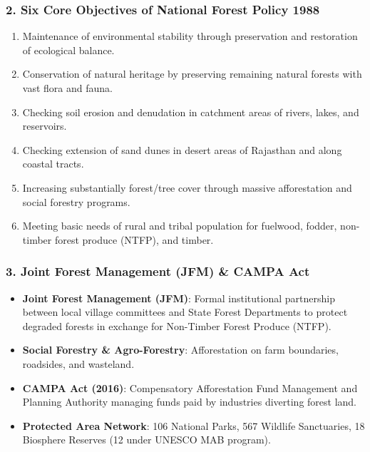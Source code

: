 \documentclass[11pt,a4paper]{article}
\begin{document}
\subsubsection{2. Six Core Objectives of National Forest Policy 1988}
\begin{enumerate}[leftmargin=*]
  \item Maintenance of environmental stability through preservation and restoration of ecological balance.
  \item Conservation of natural heritage by preserving remaining natural forests with vast flora and fauna.
  \item Checking soil erosion and denudation in catchment areas of rivers, lakes, and reservoirs.
  \item Checking extension of sand dunes in desert areas of Rajasthan and along coastal tracts.
  \item Increasing substantially forest/tree cover through massive afforestation and social forestry programs.
  \item Meeting basic needs of rural and tribal population for fuelwood, fodder, non-timber forest produce (NTFP), and timber.
\end{enumerate}

\subsubsection{3. Joint Forest Management (JFM) & CAMPA Act}
\begin{itemize}[leftmargin=*]
  \item \textbf{Joint Forest Management (JFM)}: Formal institutional partnership between local village committees and State Forest Departments to protect degraded forests in exchange for Non-Timber Forest Produce (NTFP).
  \item \textbf{Social Forestry \& Agro-Forestry}: Afforestation on farm boundaries, roadsides, and wasteland.
  \item \textbf{CAMPA Act (2016)}: Compensatory Afforestation Fund Management and Planning Authority managing funds paid by industries diverting forest land.
  \item \textbf{Protected Area Network}: 106 National Parks, 567 Wildlife Sanctuaries, 18 Biosphere Reserves (12 under UNESCO MAB program).
\end{itemize}
\end{document}
